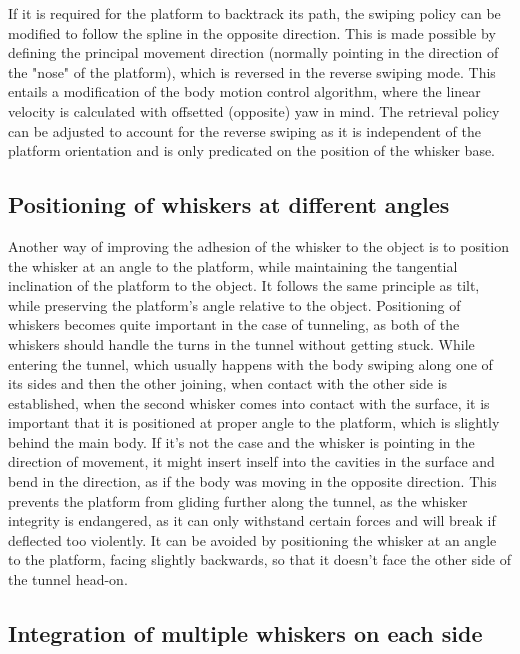 If it is required for the platform to backtrack its path, the swiping policy can be modified to follow the spline in the opposite direction.
This is made possible by defining the principal movement direction (normally pointing in the direction of the "nose" of the platform), which is reversed in the reverse swiping mode.
This entails a modification of the body motion control algorithm, where the linear velocity is calculated with offsetted (opposite) yaw in mind.
The retrieval policy can be adjusted to account for the reverse swiping as it is independent of the platform orientation and is only predicated on the position of the whisker base.


\subsection{Positioning of whiskers at different angles}

Another way of improving the adhesion of the whisker to the object is to position the whisker at an angle to the platform, while maintaining the tangential inclination of the platform to the object.
It follows the same principle as tilt, while preserving the platform's angle relative to the object.
Positioning of whiskers becomes quite important in the case of tunneling, as both of the whiskers should handle the turns in the tunnel without getting stuck.
While entering the tunnel, which usually happens with the body swiping along one of its sides and then the other joining, when contact with the other side is established, when the second whisker comes into contact with the surface, it is important that it is positioned at proper angle to the platform, which is slightly behind the main body.
If it's not the case and the whisker is pointing in the direction of movement, it might insert inself into the cavities in the surface and bend in the direction, as if the body was moving in the opposite direction.
This prevents the platform from gliding further along the tunnel, as the whisker integrity is endangered, as it can only withstand certain forces and will break if deflected too violently.
It can be avoided by positioning the whisker at an angle to the platform, facing slightly backwards, so that it doesn't face the other side of the tunnel head-on.


\subsection{Integration of multiple whiskers on each side}

